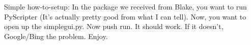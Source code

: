 Simple how-\/to-\/setup\-: In the package we received from Blake, you want to run Py\-Scripter (It's actually pretty good from what I can tell). Now, you want to open up the simplegui.\-py. Now push run. It should work. If it doesn't, Google/\-Bing the problem. Enjoy. 